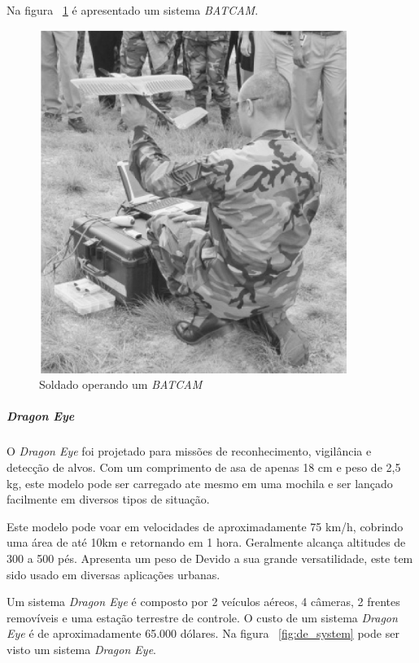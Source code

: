 Na figura ~\ref{fig:holding_batcam} é apresentado um sistema \emph{BATCAM}.

\begin{figure}[h!]
\centering
\includegraphics[width=10cm]{pictures/batcam_system.png}
\caption{ Soldado operando um \emph{BATCAM} }
 \label{fig:holding_batcam}
\end{figure}


\subparagraph{ \emph{Dragon Eye}}
O \vant \emph{Dragon Eye} foi projetado para missões de reconhecimento, vigilância e detecção de alvos. Com um comprimento de asa de apenas 18 cm e peso de 2,5 kg, este modelo pode ser carregado ate mesmo em uma mochila e ser lançado facilmente em diversos tipos de situação.

Este modelo pode voar em velocidades de aproximadamente 75 km/h, cobrindo uma área de até 10km e retornando em 1 hora. Geralmente alcança altitudes de 300 a 500 pés.
Apresenta um peso de 
Devido a sua grande versatilidade, este \vant tem sido usado em diversas aplicações urbanas. \cite{Drew2005} \cite{uav_roadmap2005}

Um sistema \emph{Dragon Eye} é composto por 2 veículos aéreos, 4 câmeras, 2 frentes removíveis e uma estação terrestre de controle. O custo de um sistema \emph{Dragon Eye} é
de aproximadamente 65.000 dólares. Na figura ~\ref{fig:de_system} pode ser visto um sistema \emph{Dragon Eye}.

